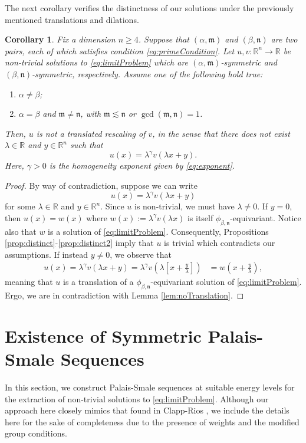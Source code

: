 \documentclass[10pt, reqno]{amsart}
\newcommand{\RR}{\mathbb{R}}
\newcommand{\m}{\mathfrak{m}}
\newcommand{\n}{\mathfrak{n}}
\numberwithin{equation}{section}
\theoremstyle{definition}
\theoremstyle{remark}
\theoremstyle{plain}
\newtheorem{cor}[prop]{Corollary}
\begin{document}
	The next corollary verifies the distinctness of our solutions under the previously mentioned translations and dilations.
	\begin{cor}
		Fix a dimension $n \ge 4$. Suppose that $(\alpha, \m)$ and $(\beta, \n)$ are two pairs, each of which satisfies condition \eqref{eq:primeCondition}. Let $u,v : \RR^n \to \RR$ be non-trivial solutions to \eqref{eq:limitProblem} which are $(\alpha,\m)$-symmetric and $(\beta,\n)$-symmetric, respectively. Assume one of the following hold true:
		\begin{enumerate}
			\item $\alpha \ne \beta$;
			\item $\alpha = \beta$ and $\m \ne \n$, with $\m \lesssim \n$ or $\gcd(\m,\n) = 1$.
		\end{enumerate}
		Then, $u$ is not a translated rescaling of $v$, in the sense that there does not exist $\lambda \in \RR$ and $y \in \RR^n$ such that
		\[
		u(x) = \lambda^\gamma v(\lambda x+ y).
		\]
		Here, $\gamma > 0$ is the homogeneity exponent given by \eqref{eq:exponent}.
	\end{cor}
	\begin{proof}
		By way of contradiction, suppose we can write
		\[
		u(x) = \lambda^\gamma v(\lambda x + y)
		\]
		for some $\lambda \in \RR$ and $y \in \RR^n$. Since $u$ is non-trivial, we must have $\lambda \ne 0$. If $y = 0$, then $u(x) = w(x)$ where $w(x) := \lambda^\gamma v(\lambda x)$ is itself $\phi_{\beta,\n}$-equivariant. Notice also that $w$ is a solution of \eqref{eq:limitProblem}. Consequently, Propositions \ref{prop:distinct}-\ref{prop:distinct2} imply that $u$ is trivial which contradicts our assumptions. If instead $y \ne 0$, we observe that
		\begin{align*}
			u(x) = \lambda^\gamma v(\lambda x + y) = \lambda^\gamma v\left(\lambda \left[ x + \frac{y}{\lambda}\right]\right)
			&= w\left(x + \frac{y}{\lambda}\right),
		\end{align*}
		meaning that $u$ is a translation of a $\phi_{\beta,\n}$-equivariant solution of \eqref{eq:limitProblem}. Ergo, we are in contradiction with Lemma \ref{lem:noTranslation}.
	\end{proof}
	
	
	\section{Existence of Symmetric Palais-Smale Sequences}
	
	In this section, we construct Palais-Smale sequences at suitable energy levels for the extraction of non-trivial solutions to \eqref{eq:limitProblem}. Although our approach here closely mimics that found in Clapp-Rios \cite{clappRios}, we include the details here for the sake of completeness due to the presence of weights and the modified group conditions. 
	
\end{document}
